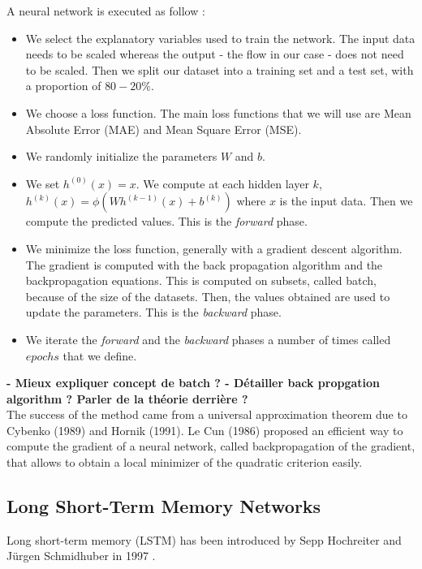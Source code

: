 A neural network is executed as follow : 
\begin{itemize}
    \item We select the explanatory variables used to train the network. The input data needs to be scaled whereas the output - the flow in our case - does not need to be scaled. Then we split our dataset into a training set and a test set, with a proportion of $80-20\%$.
    \item We choose a loss function. The main loss functions that we will use are Mean Absolute Error (MAE) and Mean Square Error (MSE).
    \item We randomly initialize the parameters $W$ and $b$. 
    \item We set $h^{(0)}(x) = x$. We compute at each hidden layer $k$, $h^{(k)}(x) = \phi (Wh^{(k-1)}(x)+b^{(k)})$ where $x$ is the input data. Then we compute the predicted values. This is the \textit{forward} phase. 
    \item We minimize the loss function, generally with a gradient descent algorithm. The gradient is computed with the back propagation algorithm and the backpropagation equations.  This is computed on subsets, called batch,  because of the size of the datasets. Then, the values obtained are used to update the parameters. This is the \textit{backward} phase. 
    \item We iterate the \textit{forward} and the \textit{backward} phases a number of times called $epochs$ that we define. 
\end{itemize}


\textbf{- Mieux expliquer concept de batch ? 
- Détailler back propgation algorithm ? Parler de la théorie derrière ? } \\




The success of the method came from a universal approximation theorem due to Cybenko (1989) and Hornik (1991). Le Cun (1986) proposed an efficient way to compute the gradient of a neural network, called backpropagation of the gradient, that allows to obtain a local minimizer of the quadratic criterion easily.
\newline



\subsection{Long Short-Term Memory Networks}

Long short-term memory (LSTM) has been introduced by Sepp Hochreiter and Jürgen Schmidhuber in 1997 \cite{lstm_createur}. 

